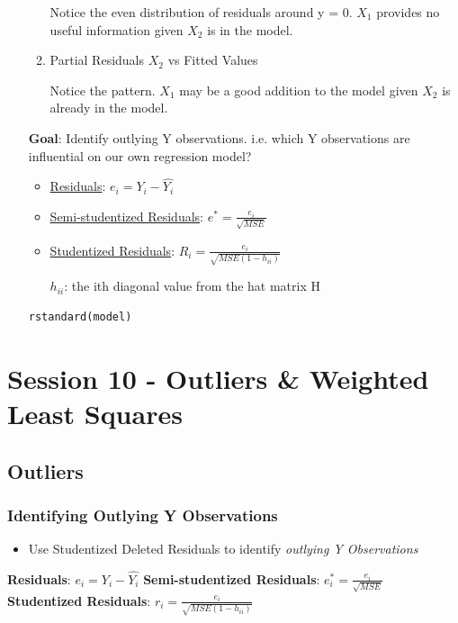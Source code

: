 \documentclass[11pt]{article}
\begin{document}
\begin{enumerate}
\begin{enumerate}
Notice the even distribution of residuals around y = 0. \(X_1\) provides no
useful information given \(X_2\) is in the model.

\item Partial Residuals \(X_2\) vs Fitted Values

Notice the pattern. \(X_1\) may be a good addition to the model given \(X_2\) is
already in the model.
\end{enumerate}

\textbf{Goal}: Identify outlying Y observations. i.e. which Y observations are
 influential on our own regression model?

\begin{itemize}
\item \uline{Residuals}: \(e_i = Y_i - \hat{Y_i}\)
\item \uline{Semi-studentized Residuals}: \(e^* = \frac{e_i}{\sqrt{MSE}}\)
\item \uline{Studentized Residuals}: \(R_i = \frac{e_i}{\sqrt{MSE(1 - h_{ii})}}\)

\(h_{ii}\): the ith diagonal value from the hat matrix H
\end{itemize}

\begin{verbatim}
rstandard(model)
\end{verbatim}
\end{enumerate}
\section{Session 10 - Outliers \& Weighted Least Squares}
\label{sec:org9cc3db3}
\subsection{Outliers}
\label{sec:org64c3487}
\subsubsection{Identifying Outlying Y Observations}
\label{sec:org7f387eb}
\begin{itemize}
\item Use Studentized Deleted Residuals to identify \emph{outlying Y Observations}
\end{itemize}

\textbf{Residuals}: \(e_i = Y_i - \hat{Y_i}\)
\textbf{Semi-studentized Residuals}: \(e_i^* = \frac{e_i}{\sqrt{MSE}}\)
\textbf{Studentized Residuals}: \(r_i =\frac{e_i}{\sqrt{MSE(1 - h_{ii})}}\)
\end{document}

